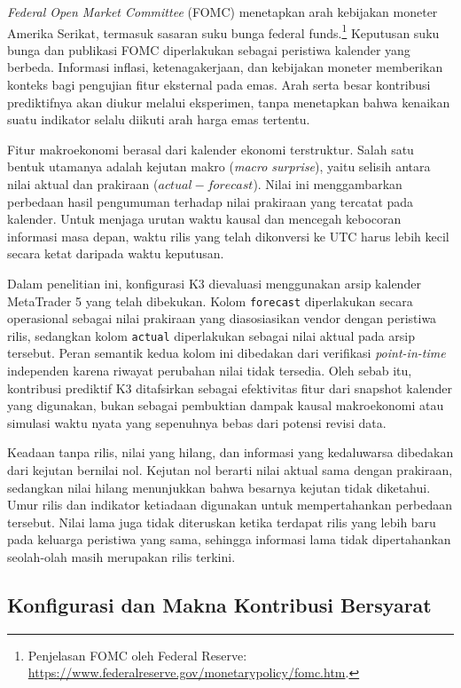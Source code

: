 \emph{Federal Open Market Committee} (FOMC) menetapkan arah kebijakan moneter Amerika Serikat, termasuk sasaran suku bunga federal funds.\footnote{Penjelasan FOMC oleh Federal Reserve: \url{https://www.federalreserve.gov/monetarypolicy/fomc.htm}.} Keputusan suku bunga dan publikasi FOMC diperlakukan sebagai peristiwa kalender yang berbeda. Informasi inflasi, ketenagakerjaan, dan kebijakan moneter memberikan konteks bagi pengujian fitur eksternal pada emas. Arah serta besar kontribusi prediktifnya akan diukur melalui eksperimen, tanpa menetapkan bahwa kenaikan suatu indikator selalu diikuti arah harga emas tertentu.

Fitur makroekonomi berasal dari kalender ekonomi terstruktur. Salah satu bentuk utamanya adalah kejutan makro (\emph{macro surprise}), yaitu selisih antara nilai aktual dan prakiraan ($actual - forecast$). Nilai ini menggambarkan perbedaan hasil pengumuman terhadap nilai prakiraan yang tercatat pada kalender. Untuk menjaga urutan waktu kausal dan mencegah kebocoran informasi masa depan, waktu rilis yang telah dikonversi ke UTC harus lebih kecil secara ketat daripada waktu keputusan.

Dalam penelitian ini, konfigurasi K3 dievaluasi menggunakan arsip kalender MetaTrader 5 yang telah dibekukan. Kolom \texttt{forecast} diperlakukan secara operasional sebagai nilai prakiraan yang diasosiasikan vendor dengan peristiwa rilis, sedangkan kolom \texttt{actual} diperlakukan sebagai nilai aktual pada arsip tersebut. Peran semantik kedua kolom ini dibedakan dari verifikasi \emph{point-in-time} independen karena riwayat perubahan nilai tidak tersedia. Oleh sebab itu, kontribusi prediktif K3 ditafsirkan sebagai efektivitas fitur dari snapshot kalender yang digunakan, bukan sebagai pembuktian dampak kausal makroekonomi atau simulasi waktu nyata yang sepenuhnya bebas dari potensi revisi data.

Keadaan tanpa rilis, nilai yang hilang, dan informasi yang kedaluwarsa dibedakan dari kejutan bernilai nol. Kejutan nol berarti nilai aktual sama dengan prakiraan, sedangkan nilai hilang menunjukkan bahwa besarnya kejutan tidak diketahui. Umur rilis dan indikator ketiadaan digunakan untuk mempertahankan perbedaan tersebut. Nilai lama juga tidak diteruskan ketika terdapat rilis yang lebih baru pada keluarga peristiwa yang sama, sehingga informasi lama tidak dipertahankan seolah-olah masih merupakan rilis terkini.

\subsection{Konfigurasi dan Makna Kontribusi Bersyarat}

